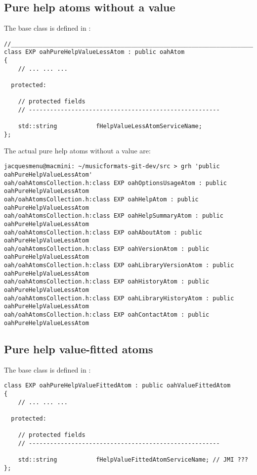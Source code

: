 \subsection{Pure help atoms without a value}

The base  class   is defined in :
\begin{lstlisting}[language=CPlusPlus]
//______________________________________________________________________________
class EXP oahPureHelpValueLessAtom : public oahAtom
{
	// ... ... ...

  protected:

    // protected fields
    // ------------------------------------------------------

    std::string           fHelpValueLessAtomServiceName;
};
\end{lstlisting}

The actual pure help atoms without a value are:
\begin{lstlisting}[language=Terminal]
jacquesmenu@macmini: ~/musicformats-git-dev/src > grh 'public oahPureHelpValueLessAtom'
oah/oahAtomsCollection.h:class EXP oahOptionsUsageAtom : public oahPureHelpValueLessAtom
oah/oahAtomsCollection.h:class EXP oahHelpAtom : public oahPureHelpValueLessAtom
oah/oahAtomsCollection.h:class EXP oahHelpSummaryAtom : public oahPureHelpValueLessAtom
oah/oahAtomsCollection.h:class EXP oahAboutAtom : public oahPureHelpValueLessAtom
oah/oahAtomsCollection.h:class EXP oahVersionAtom : public oahPureHelpValueLessAtom
oah/oahAtomsCollection.h:class EXP oahLibraryVersionAtom : public oahPureHelpValueLessAtom
oah/oahAtomsCollection.h:class EXP oahHistoryAtom : public oahPureHelpValueLessAtom
oah/oahAtomsCollection.h:class EXP oahLibraryHistoryAtom : public oahPureHelpValueLessAtom
oah/oahAtomsCollection.h:class EXP oahContactAtom : public oahPureHelpValueLessAtom
\end{lstlisting}


\subsection{Pure help value-fitted atoms}

The base  class   is defined in :
\begin{lstlisting}[language=CPlusPlus]
class EXP oahPureHelpValueFittedAtom : public oahValueFittedAtom
{
	// ... ... ...

  protected:

    // protected fields
    // ------------------------------------------------------

    std::string           fHelpValueFittedAtomServiceName; // JMI ???
};

\end{lstlisting}

